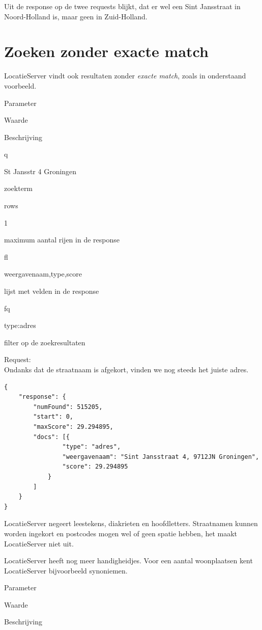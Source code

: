 \documentclass[]{book}
\begin{document}
Uit de response op de twee requests blijkt, dat er wel een Sint Jansstraat in Noord-Holland is, maar geen in Zuid-Holland.

\hypertarget{zoeken-zonder-exacte-match}{%
\section{Zoeken zonder exacte match}\label{zoeken-zonder-exacte-match}}

LocatieServer vindt ook resultaten zonder \emph{exacte match}, zoals in onderstaand voorbeeld.

Parameter

Waarde

Beschrijving

{q}

{St Jansstr 4 Groningen}

zoekterm

{rows}

{1}

maximum aantal rijen in de response

{fl}

{weergavenaam,type,score}

lijst met velden in de response

{fq}

{type:adres}

filter op de zoekresultaten

Request:\\

Ondanks dat de straatnaam is afgekort, vinden we nog steeds het juiste adres.

\begin{verbatim}
{
    "response": {
        "numFound": 515205,
        "start": 0,
        "maxScore": 29.294895,
        "docs": [{
                "type": "adres",
                "weergavenaam": "Sint Jansstraat 4, 9712JN Groningen",
                "score": 29.294895
            }
        ]
    }
}
\end{verbatim}

LocatieServer negeert leestekens, diakrieten en hoofdletters. Straatnamen kunnen worden ingekort en postcodes mogen wel of geen spatie hebben, het maakt LocatieServer niet uit.

LocatieServer heeft nog meer handigheidjes. Voor een aantal woonplaatsen kent LocatieServer bijvoorbeeld synoniemen.

Parameter

Waarde

Beschrijving
\end{document}
